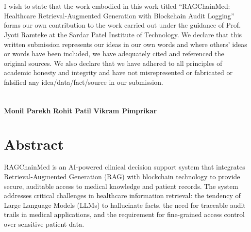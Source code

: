 \documentclass[12pt,singleside,a4paper]{article}
\begin{document}
\section*{}

\vspace{3.5cm}
I wish to state that the work embodied in this work titled ``RAGChainMed: Healthcare Retrieval-Augmented Generation with Blockchain Audit Logging'' forms our own contribution to the work carried out under the guidance of Prof. Jyoti Ramteke at the Sardar Patel Institute of Technology. We declare that this written submission represents our ideas in our own words and where others' ideas or words have been included, we have adequately cited and referenced the original sources. We also declare that we have adhered to all principles of academic honesty and integrity and have not misrepresented or fabricated or falsified any idea/data/fact/source in our submission.
\\
\\
\\
\textbf{Monil Parekh} \hspace{2cm} \textbf{Rohit Patil} \hspace{2cm} \textbf{Vikram Pimprikar}\\ 
\vspace{4cm}

\pagebreak

\section*{Abstract}

RAGChainMed is an AI-powered clinical decision support system that integrates Retrieval-Augmented Generation (RAG) with blockchain technology to provide secure, auditable access to medical knowledge and patient records. The system addresses critical challenges in healthcare information retrieval: the tendency of Large Language Models (LLMs) to hallucinate facts, the need for traceable audit trails in medical applications, and the requirement for fine-grained access control over sensitive patient data.
\end{document}
